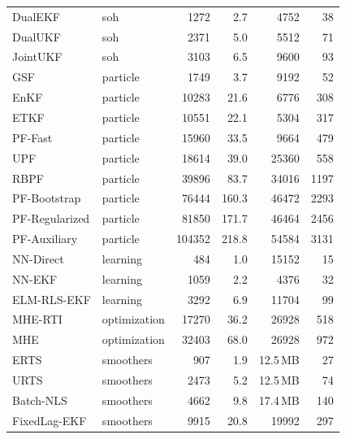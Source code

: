 \begin{longtable}{llrrrr}
DualEKF & soh & 1272 & 2.7 & 4752 & 38 \\
DualUKF & soh & 2371 & 5.0 & 5512 & 71 \\
JointUKF & soh & 3103 & 6.5 & 9600 & 93 \\
GSF & particle & 1749 & 3.7 & 9192 & 52 \\
EnKF & particle & 10283 & 21.6 & 6776 & 308 \\
ETKF & particle & 10551 & 22.1 & 5304 & 317 \\
PF-Fast & particle & 15960 & 33.5 & 9664 & 479 \\
UPF & particle & 18614 & 39.0 & 25360 & 558 \\
RBPF & particle & 39896 & 83.7 & 34016 & 1197 \\
PF-Bootstrap & particle & 76444 & 160.3 & 46472 & 2293 \\
PF-Regularized & particle & 81850 & 171.7 & 46464 & 2456 \\
PF-Auxiliary & particle & 104352 & 218.8 & 54584 & 3131 \\
NN-Direct & learning & 484 & 1.0 & 15152 & 15 \\
NN-EKF & learning & 1059 & 2.2 & 4376 & 32 \\
ELM-RLS-EKF & learning & 3292 & 6.9 & 11704 & 99 \\
MHE-RTI & optimization & 17270 & 36.2 & 26928 & 518 \\
MHE & optimization & 32403 & 68.0 & 26928 & 972 \\
ERTS & smoothers & 907 & 1.9 & 12.5\,MB & 27 \\
URTS & smoothers & 2473 & 5.2 & 12.5\,MB & 74 \\
Batch-NLS & smoothers & 4662 & 9.8 & 17.4\,MB & 140 \\
FixedLag-EKF & smoothers & 9915 & 20.8 & 19992 & 297 \\
\bottomrule\end{longtable}
